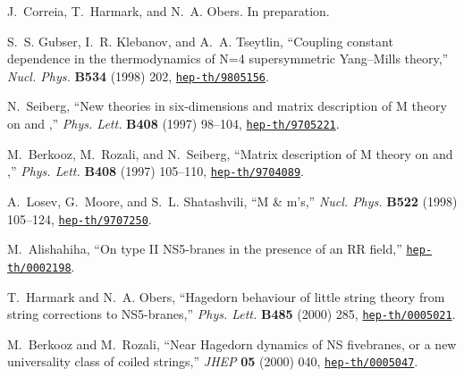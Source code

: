 \documentclass[a4paper,twoside,titlepage,12pt]{article}
\begin{document}
\begin{thebibliography}{10}
J.~Correia, T.~Harmark, and N.~A. Obers. In preparation.

S.~S. Gubser, I.~R. Klebanov, and A.~A. Tseytlin, ``Coupling constant
  dependence in the thermodynamics of {N=4} supersymmetric {Yang--Mills}
  theory,'' {\em Nucl. Phys.} {\bf B534} (1998) 202,
\href{http://www.arXiv.org/abs/hep-th/9805156}{{\tt hep-th/9805156}}.

N.~Seiberg, ``New theories in six-dimensions and matrix description of {M}
  theory on {\coordHE{}} and {\coordHE{}},'' {\em Phys. Lett.} {\bf B408} (1997)
  98--104,
\href{http://www.arXiv.org/abs/hep-th/9705221}{{\tt hep-th/9705221}}.

M.~Berkooz, M.~Rozali, and N.~Seiberg, ``Matrix description of {M} theory on
  {\coordHE{}} and {\coordHE{}},'' {\em Phys. Lett.} {\bf B408} (1997) 105--110,
  \href{http://www.arXiv.org/abs/hep-th/9704089}{{\tt hep-th/9704089}}.

A.~Losev, G.~Moore, and S.~L. Shatashvili, ``M {\&} m's,'' {\em Nucl. Phys.}
  {\bf B522} (1998) 105--124,
  \href{http://www.arXiv.org/abs/hep-th/9707250}{{\tt hep-th/9707250}}.

M.~Alishahiha, ``On type {II} {NS5-branes} in the presence of an {RR} field,''
\href{http://www.arXiv.org/abs/hep-th/0002198}{{\tt hep-th/0002198}}.

T.~Harmark and N.~A. Obers, ``Hagedorn behaviour of little string theory from
  string corrections to {NS5-branes},'' {\em Phys. Lett.} {\bf B485} (2000)
  285,
\href{http://www.arXiv.org/abs/hep-th/0005021}{{\tt hep-th/0005021}}.

M.~Berkooz and M.~Rozali, ``Near {Hagedorn} dynamics of {NS} fivebranes, or a
  new universality class of coiled strings,'' {\em JHEP} {\bf 05} (2000) 040,
\href{http://www.arXiv.org/abs/hep-th/0005047}{{\tt hep-th/0005047}}.

\end{thebibliography}\endgroup
\end{document}
